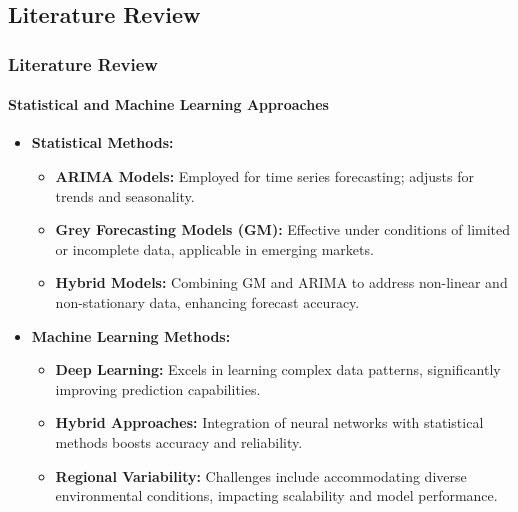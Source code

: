 \documentclass[light]{lutbeamer} %
\begin{document}
\subsection{Literature Review}

\begin{frame}
    \frametitle{Literature Review}
    \framesubtitle{Statistical and Machine Learning Approaches}
    \begin{itemize}
        \item \textbf{Statistical Methods:}
              \begin{itemize}
                  \item \textbf{ARIMA Models:} Employed for time series forecasting; adjusts for trends and seasonality.
                  \item \textbf{Grey Forecasting Models (GM):} Effective under conditions of limited or incomplete data, applicable in emerging markets.
                  \item \textbf{Hybrid Models:} Combining GM and ARIMA to address non-linear and non-stationary data, enhancing forecast accuracy.
              \end{itemize}
        \item \textbf{Machine Learning Methods:}
              \begin{itemize}
                  \item \textbf{Deep Learning:} Excels in learning complex data patterns, significantly improving prediction capabilities.
                  \item \textbf{Hybrid Approaches:} Integration of neural networks with statistical methods boosts accuracy and reliability.
                  \item \textbf{Regional Variability:} Challenges include accommodating diverse environmental conditions, impacting scalability and model performance.
              \end{itemize}
    \end{itemize}
\end{frame}


\end{document}
